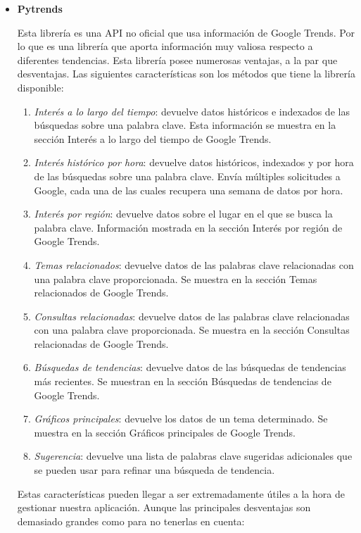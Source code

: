 \begin{itemize}
    \item
    \textbf{Pytrends} \cite{pytrends-manual}
    
    Esta librería es una API no oficial que usa información de Google Trends. Por lo que es una librería que aporta información muy valiosa respecto a diferentes tendencias. Esta librería posee numerosas ventajas, a la par que desventajas. Las siguientes características son los métodos que tiene la librería disponible:
    \begin{enumerate}
    \item \textit{Interés a lo largo del tiempo}: devuelve datos históricos e indexados de las búsquedas sobre una palabra clave. Esta información se muestra en la sección Interés a lo largo del tiempo de Google Trends.
    \item \textit{Interés histórico por hora}: devuelve datos históricos, indexados y por hora de las búsquedas sobre una palabra clave. Envía múltiples solicitudes a Google, cada una de las cuales recupera una semana de datos por hora.
    \item \textit{Interés por región}: devuelve datos sobre el lugar en el que se busca la palabra clave. Información mostrada en la sección Interés por región de Google Trends.
    \item \textit{Temas relacionados}: devuelve datos de las palabras clave relacionadas con una palabra clave proporcionada. Se muestra en la sección Temas relacionados de Google Trends.
    \item \textit{Consultas relacionadas}: devuelve datos de las palabras clave relacionadas con una palabra clave proporcionada. Se muestra en la sección Consultas relacionadas de Google Trends.
    \item \textit{Búsquedas de tendencias}: devuelve datos de las búsquedas de tendencias más recientes. Se muestran en la sección Búsquedas de tendencias de Google Trends.
    \item \textit{Gráficos principales}: devuelve los datos de un tema determinado. Se muestra en la sección Gráficos principales de Google Trends.
    \item \textit{Sugerencia}: devuelve una lista de palabras clave sugeridas adicionales que se pueden usar para refinar una búsqueda de tendencia.
    \end{enumerate}

    Estas características pueden llegar a ser extremadamente útiles a la hora de gestionar nuestra aplicación. Aunque las principales desventajas son demasiado grandes como para no tenerlas en cuenta:


\end{itemize}
